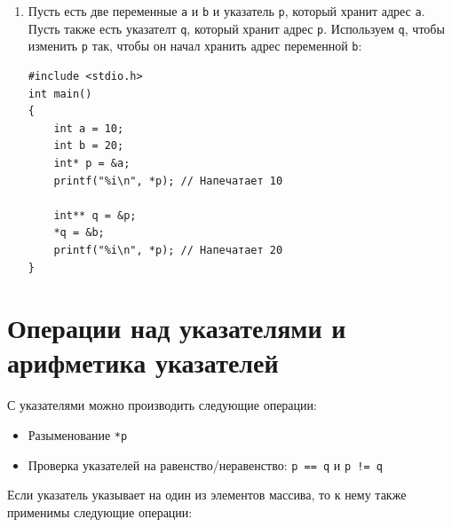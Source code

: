 \documentclass[10pt]{article}
\begin{document}
\begin{enumerate}
\item Пусть есть две переменные \texttt{a} и \texttt{b} и указатель \texttt{p}, который хранит адрес \texttt{a}. Пусть также есть указателт \texttt{q}, который хранит адрес \texttt{p}. Используем \texttt{q}, чтобы изменить \texttt{p} так, чтобы он начал хранить адрес переменной \texttt{b}:
\begin{lstlisting}
#include <stdio.h>
int main() 
{
    int a = 10;
    int b = 20;
    int* p = &a;
    printf("%i\n", *p); // Напечатает 10
    
    int** q = &p;
    *q = &b;
    printf("%i\n", *p); // Напечатает 20
}
\end{lstlisting}
\end{enumerate}

\section*{Операции над указателями и арифметика указателей}
С указателями можно производить следующие операции:
\begin{itemize}
\item Разыменование \texttt{*p}
\item Проверка указателей на равенство/неравенство: \texttt{p == q} и \texttt{p != q}
\end{itemize}
Если указатель указывает на один из элементов массива, то к нему также применимы следующие операции:
\end{document}
